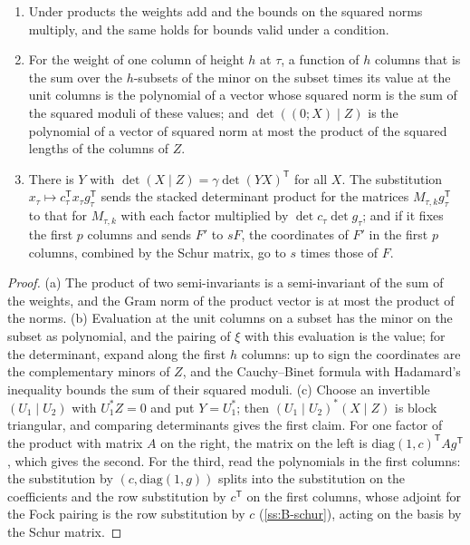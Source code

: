 \begin{lemma}\label{lem:det-weights}
\begin{enumerate}[label=\textup{(\alph*)}]
\item Under products the weights add and the bounds on the squared norms multiply, and the same holds for bounds valid under a condition.
\item For the weight of one column of height $h$ at $\tau$, a function of $h$ columns that is the sum over the $h$-subsets of the minor on the subset times its value at the unit columns is the polynomial of a vector whose squared norm is
the sum of the squared moduli of these values; and $\det((0;X)\mid Z)$ is the polynomial of a vector of squared norm at most the product of the squared lengths of the columns of $Z$.
\item There is $Y$ with $\det(X\mid Z)=\gamma\det(YX)^{\mathsf T}$ for all $X$. The substitution $x_\tau\mapsto c_\tau^{\mathsf T}x_\tau g_\tau^{\mathsf T}$ sends the stacked determinant product for the matrices $M_{\tau,k}g_\tau^{\mathsf T}$ to that for $M_{\tau,k}$ with each factor
multiplied by $\det c_\tau\det g_\tau$; and if it fixes the first $p$ columns and sends $F'$ to $sF$, the coordinates of $F'$ in the first $p$ columns, combined by the Schur matrix, go to $s$ times those of $F$.
\end{enumerate}
\end{lemma}

\begin{proof}
(a) The product of two semi-invariants is a semi-invariant of the sum of the weights, and the Gram norm of the product vector is at most the product of the norms. (b) Evaluation at the unit columns on a subset has the minor on the
subset as polynomial, and the pairing of $\xi$ with this evaluation is the value; for the determinant, expand along the first $h$ columns: up to sign the coordinates are the complementary minors of $Z$, and the Cauchy--Binet formula with
Hadamard's inequality bounds the sum of their squared moduli. (c) Choose an invertible $(U_1\mid U_2)$ with $U_1^*Z=0$ and put $Y=U_1^*$; then $(U_1\mid U_2)^*(X\mid Z)$ is block triangular, and comparing determinants gives the first claim. For one factor
of the product with matrix $A$ on the right, the matrix on the left is $\mathrm{diag}(1,c)^{\mathsf T}Ag^{\mathsf T}$, which gives the second. For the third, read the polynomials in the first columns: the substitution by $(c,\mathrm{diag}(1,g))$ splits into the
substitution on the coefficients and the row substitution by $c^{\mathsf T}$ on the first columns, whose adjoint for the Fock pairing is the row substitution by $c$ (\cref{ss:B-schur}), acting on the basis by the Schur matrix.
\end{proof}

